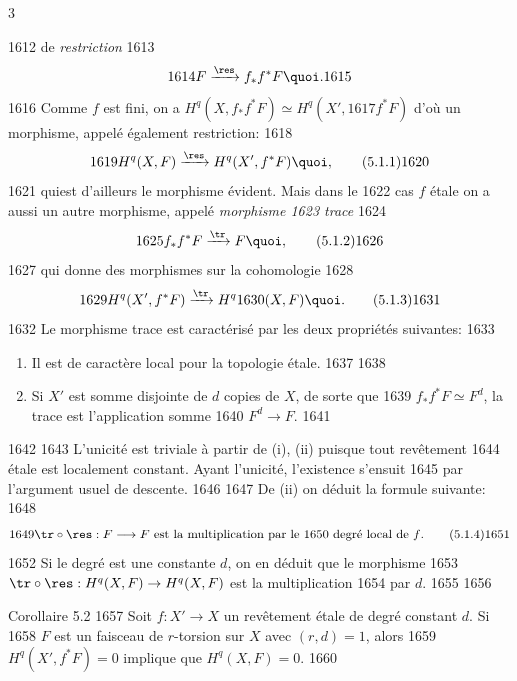 3	\documentclass[10pt]{../fichiers-configuration-latex/smfart}
\begin{document}
  1612	de \emph{restriction}
  1613	$$
  1614	F\xrightarrow{\res}f_{\ast}f^{\ast}F{\quoi}.
  1615	$$
  1616	Comme $f$ est fini, on a $H^q(X,f_{\ast}f^{\ast}F)\simeq H^q(X',
  1617	f^{\ast}F)$ d'où un morphisme, appelé également restriction:
  1618	\begin{equation*}
  1619	H^q(X,F)\xrightarrow{\res}H^q(X',f^{\ast} F){\quoi},\tag{5.1.1}
  1620	\end{equation*}
  1621	qui\pageoriginale est d'ailleurs le morphisme évident. Mais dans le
  1622	cas $f$ étale on a aussi un autre morphisme, appelé \emph{morphisme
  1623	trace}
  1624	\begin{equation*}
  1625	f_{\ast}f^{\ast} F\xrightarrow{\tr} F{\quoi},\tag{5.1.2}
  1626	\end{equation*}
  1627	qui donne des morphismes sur la cohomologie
  1628	\begin{equation*}
  1629	H^q(X', f^{\ast} F)\xrightarrow{\tr}H^q
  1630	(X,F){\quoi}.\tag{5.1.3}
  1631	\end{equation*}
  1632	Le morphisme trace est caractérisé par les deux propriétés suivantes:
  1633	\begin{enumerate}
  1634	\renewcommand{\theenumi}{\roman{enumi}}
  1635	\renewcommand{\labelenumi}{(\theenumi)}
  1636	\item Il est de caractère local pour la topologie étale.
  1637	
  1638	\item Si $X'$ est somme disjointe de $d$ copies de $X$, de sorte que
  1639	$f_{\ast}f^{\ast} F\simeq F^d$, la trace est l'application somme
  1640	$F^d\rightarrow F$.
  1641	\end{enumerate}
  1642	
  1643	L'unicité est triviale à partir de (i), (ii) puisque tout revêtement
  1644	étale est localement constant. Ayant l'unicité, l'existence s'ensuit
  1645	par l'argument usuel de descente.
  1646	
  1647	De (ii) on déduit la formule suivante:
  1648	\begin{equation*}
  1649	\tr\circ \res:F\longrightarrow F\mbox{ est la multiplication par le
  1650	degré local de $f$.}\tag{5.1.4}
  1651	\end{equation*}
  1652	Si le degré est une constante $d$, on en déduit que le morphisme
  1653	$\tr\circ \res: H^q(X,F)\rightarrow H^q(X,F)$ est la multiplication
  1654	par $d$.
  1655	
  1656	\begin{enonce*}{Corollaire 5.2}
  1657	Soit $f:X'\rightarrow X$ un revêtement étale de degré constant $d$. Si
  1658	$F$ est un faisceau de $r$-torsion sur $X$ avec $(r,d)=1$, alors
  1659	$H^q(X',f^{\ast} F)=0$ implique que $H^q(X,F)=0$.
  1660	\end{enonce*}
\end{document}
